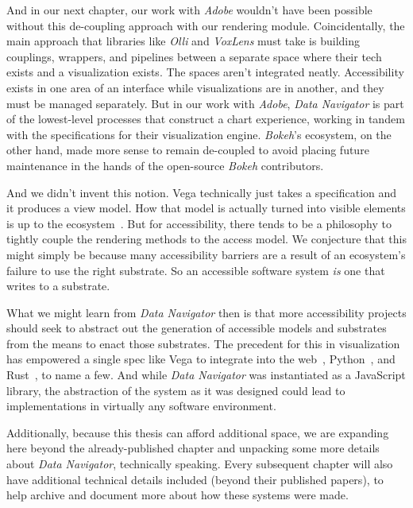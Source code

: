 \documentclass[12pt]{cmuthesis}
\begin{document}
And in our next chapter, our work with \textit{Adobe} wouldn't have been possible without this de-coupling approach with our rendering module. Coincidentally, the main approach that libraries like \textit{Olli} and \textit{VoxLens} must take is building couplings, wrappers, and pipelines between a separate space where their tech exists and a visualization exists. The spaces aren't integrated neatly. Accessibility exists in one area of an interface while visualizations are in another, and they must be managed separately. But in our work with \textit{Adobe}, \textit{Data Navigator} is part of the lowest-level processes that construct a chart experience, working in tandem with the specifications for their visualization engine. \textit{Bokeh}'s ecosystem, on the other hand, made more sense to remain de-coupled to avoid placing future maintenance in the hands of the open-source \textit{Bokeh} contributors.


And we didn't invent this notion. Vega technically just takes a specification and it produces a view model. How that model is actually turned into visible elements is up to the ecosystem~\cite{Satyanarayan2017VegaLite}. But for accessibility, there tends to be a philosophy to tightly couple the rendering methods to the access model. We conjecture that this might simply be because many accessibility barriers are a result of an ecosystem's failure to use the right substrate. So an accessible software system \textit{is} one that writes to a substrate.

What we might learn from \textit{Data Navigator} then is that more accessibility projects should seek to abstract out the generation of accessible models and substrates from the means to enact those substrates. The precedent for this in visualization has empowered a single spec like Vega to integrate into the web~\cite{Satyanarayan2017VegaLite}, Python~\cite{VanderPlas2018}, and Rust~\cite{Kruchten2022}, to name a few. And while \textit{Data Navigator} was instantiated as a JavaScript library, the abstraction of the system as it was designed could lead to implementations in virtually any software environment.

Additionally, because this thesis can afford additional space, we are expanding here beyond the already-published chapter and unpacking some more details about \textit{Data Navigator}, technically speaking. Every subsequent chapter will also have additional technical details included (beyond their published papers), to help archive and document more about how these systems were made.
\end{document}
